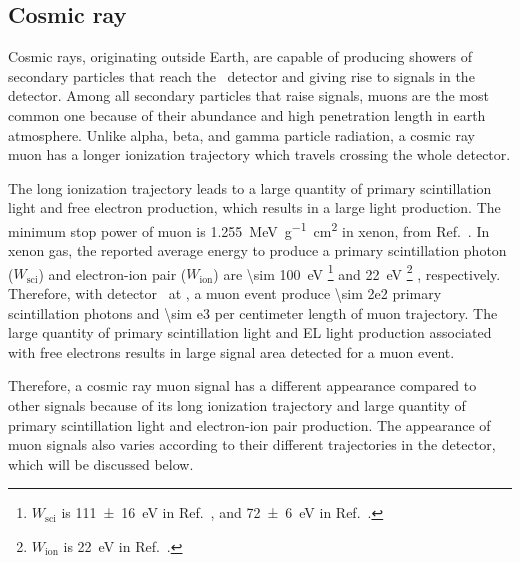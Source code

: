 \subsection{Cosmic ray}
\label{sec:events muon}
Cosmic rays, originating outside Earth, are capable of producing showers of secondary particles that reach the \gtest\ detector and giving rise to signals in the detector. Among all secondary particles that raise signals, muons are the most common one because of their abundance and high penetration length in earth atmosphere. Unlike alpha, beta, and gamma particle radiation, a cosmic ray muon has a longer ionization trajectory which travels crossing the whole detector. 

The long ionization trajectory leads to a large quantity of primary scintillation light and free electron production, which results in a large light production. The minimum stop power of muon is \SI{1.255}{\MeV\per\g\cm\squared} in xenon, from Ref.~\cite{Groom2001}. In xenon gas, the reported average energy to produce a primary scintillation photon ($W_\text{sci}$) and electron-ion pair ($W_\text{ion}$) are \SI{\sim 100}{\eV} 
	\footnote{$W_\text{sci}$ is \SI[separate-uncertainty=false]{111 \pm 16}{\eV} in Ref.~\cite{Carmo2008}, and \SI[separate-uncertainty=false]{72 \pm 6}{\eV} in Ref.~\cite{Fernandes2010}.} 
	and \SI{22}{\eV} 
	\footnote{$W_\text{ion}$ is \SI{22}{\eV} in Ref.~\cite{Fano1963, Ahlen1980, Alvarez2013}.}
	, respectively. Therefore, with detector \opgd\ at \standarddensity , a muon event produce \num{\sim 2e2} primary scintillation photons and \num{\sim e3} per centimeter length of muon trajectory. The large quantity of primary scintillation light and EL light production associated with free electrons results in large signal area detected for a muon event.

Therefore, a cosmic ray muon signal has a different appearance compared to other signals because of its long ionization trajectory and large quantity of primary scintillation light and electron-ion pair production. The appearance of muon signals also varies according to their different trajectories in the detector, which will be discussed below.
 
